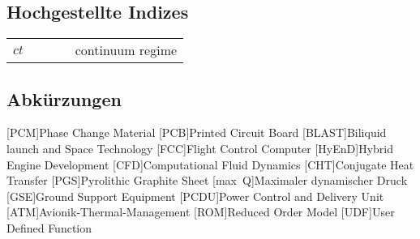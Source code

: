\subsection*{Hochgestellte Indizes}

\begin{supertabular}{p{10mm}p{3mm}p{20mm}p{3mm}l}
$ct$ && && continuum regime\\
\end{supertabular} 

\newpage

\subsection*{Abkürzungen}
\begin{acronym}[BLAST]
[PCM]{Phase Change Material}
[PCB]{Printed Circuit Board}
[BLAST]{Biliquid launch and Space Technology}
[FCC]{Flight Control Computer}
[HyEnD]{Hybrid Engine Development}
[CFD]{Computational Fluid Dynamics}
[CHT]{Conjugate Heat Transfer}
[PGS]{Pyrolithic Graphite Sheet}
[max~Q]{Maximaler dynamischer Druck}
[GSE]{Ground Support Equipment}
[PCDU]{Power Control and Delivery Unit}
[ATM]{Avionik-Thermal-Management}
[ROM]{Reduced Order Model}
[UDF]{User Defined Function}
\end{acronym}